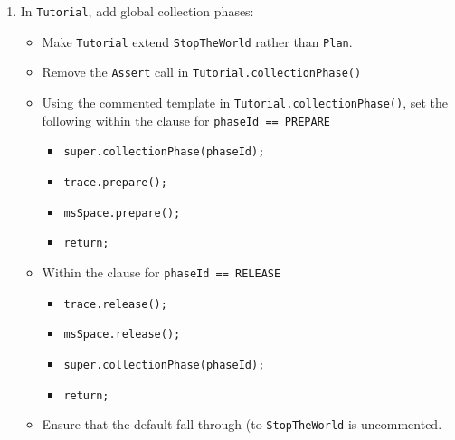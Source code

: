 \documentclass[textsize=14pt]{article}
\newcommand{\code}[1]{\texttt{#1}}
\begin{document}
\begin{itemize}
\begin{enumerate}
\begin{enumerate}
        \item In \code{Tutorial}, add global collection phases:
        \begin{itemize}
            \item Make \code{Tutorial} extend \code{StopTheWorld} rather than \code{Plan}.
            \item Remove the \code{Assert} call in \code{Tutorial.collectionPhase()}
            \item Using the commented template in
            \code{Tutorial.collectionPhase()}, set the following
            within the clause for
            \code{phaseId == PREPARE}
            \begin{itemize}
                \item[] \code{super.collectionPhase(phaseId);}
                \item[] \code{trace.prepare();}
                \item[] \code{msSpace.prepare();}
                \item[] \code{return;}
            \end{itemize}
            \item Within the clause for \code{phaseId == RELEASE}
            \begin{itemize}
                \item[] \code{trace.release();}
                \item[] \code{msSpace.release();}
                \item[] \code{super.collectionPhase(phaseId);}
                \item[] \code{return;}
            \end{itemize}
            \item Ensure that the default fall through (to
            \code{StopTheWorld} is uncommented.
        \end{itemize}


\end{enumerate}
\end{enumerate}
\end{itemize}
\end{document}
